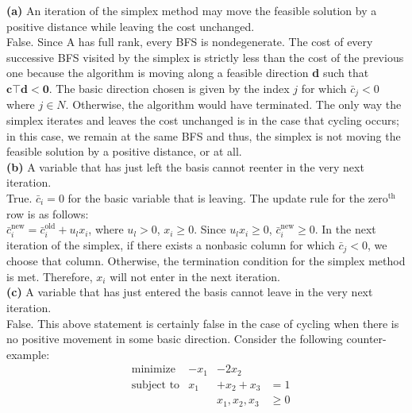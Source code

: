 \documentclass{article}
\begin{document}
\noindent
\textbf{(a)} An iteration of the simplex method may move the feasible solution by a positive distance while leaving the cost unchanged. \\

\noindent
False.  Since A has full rank, every BFS is nondegenerate.  The cost of every successive BFS visited by the simplex is strictly less than the cost of the previous one because the algorithm is moving along a feasible direction \textbf{d} such that $\mathbf{c\top d < 0}$.  The basic direction chosen is given by the index $j$ for which $\bar{c}_j < 0$ where $j \in N$. Otherwise, the algorithm would have terminated.  The only way the simplex iterates and leaves the cost unchanged is in the case that cycling occurs; in this case, we remain at the same BFS and thus, the simplex is not moving the feasible solution by a positive distance, or at all. \\

\noindent
\textbf{(b)} A variable that has just left the basis cannot reenter in the very next iteration. \\

\noindent
True. $\bar{c}_i = 0$ for the basic variable that is leaving.  The update rule for the zero$^\text{th}$ row is as follows: \\
$\bar{c}_i^{\text{new}} = \bar{c}_i^{\text{old}} + u_l x_i$, where $u_l > 0$, $x_i \geq 0$.
Since $u_l x_i \geq 0$, $\bar{c}_i^{\text{new}} \geq 0$.  In the next iteration of the simplex, if there exists a nonbasic column for which $\bar{c}_j < 0$, we choose that column.  Otherwise, the termination condition for the simplex method is met.  Therefore, $x_i$ will not enter in the next iteration.\\

\noindent
\textbf{(c)} A variable that has just entered the basis cannot leave in the very next iteration.\\

\noindent
False.  This above statement is certainly false in the case of cycling when there is no positive movement in some basic direction.  Consider the following counter-example:
\begin{equation*}
\begin{aligned}
& \text{minimize} &  -x_1 & - 2x_2 &\\
& \text{subject to} &  x_1 & + x_2  + x_3 & = 1 \\
& 			&& 	x_1, x_2, x_3 &\geq 0 
\end{aligned}
\end{equation*}
\end{document}
